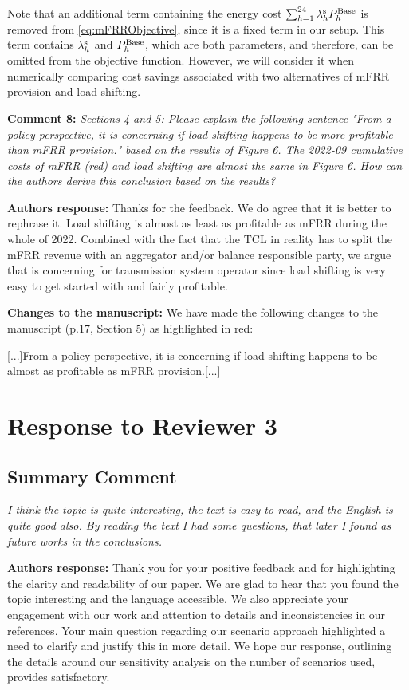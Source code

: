 \documentclass[10pt]{article}
\newcommand{\nt}[1]{\textcolor{newtextcolor}{#1}}
\newcommand{\auth}{\textbf{Authors response: }}
\newcommand{\changes}{\textbf{Changes to the manuscript: }}
\begin{document}
\nt{
Note that an additional term containing the energy cost $\sum_{h=1}^{24} \lambda^{\rm{s}}_{h}P^{\rm{Base}}_{h}$ is removed from \eqref{eq:mFRRObjective}, since it is a fixed term in our setup. This term contains $\lambda^{\rm{s}}_{h}$ and $P^{\rm{Base}}_{h}$, which are both parameters, and therefore, can be omitted from the objective function. However, we will consider it when numerically comparing cost savings associated with two alternatives of mFRR provision and load shifting.
}

\textbf{Comment 8:} \textit{Sections 4 and 5: Please explain the following sentence "From a policy perspective, it is concerning if load shifting happens to be more profitable than mFRR provision." based on the results of Figure 6. The 2022-09 cumulative costs of mFRR (red) and load shifting are almost the same in Figure 6. How can the authors derive this conclusion based on the results?}

\auth Thanks for the feedback. We do agree that it is better to rephrase it. Load shifting is almost as least as profitable as mFRR during the whole of 2022. Combined with the fact that the TCL in reality has to split the mFRR revenue with an aggregator and/or balance responsible party, we argue that is concerning for transmission system operator since load shifting is very easy to get started with and fairly profitable.

\changes We have made the following changes to the manuscript (p.17, Section 5) as highlighted in red:

[...]From a policy perspective, it is concerning if load shifting happens to be \nt{almost as} profitable \nt{as} mFRR provision.[...]


\newpage
\section{Response to Reviewer 3}

\subsection{Summary Comment} \textit{I think the topic is quite interesting, the text is easy to read, and the English is quite good also. By reading the text I had some questions, that later I found as future works in the conclusions.}

\auth Thank you for your positive feedback and for highlighting the clarity and readability of our paper. We are glad to hear that you found the topic interesting and the language accessible. We also appreciate your engagement with our work and attention to details and inconsistencies in our references. Your main question regarding our scenario approach highlighted a need to clarify and justify this in more detail. We hope our response, outlining the details around our sensitivity analysis on the number of scenarios used, provides satisfactory.
\end{document}
